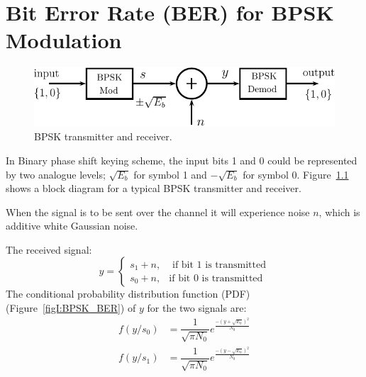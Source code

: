 
\chapter{Bit Error Rate (BER) for BPSK Modulation} \label{appendA}

\begin{figure}[!h]
\centering
\includegraphics[width=\textwidth]{./append1/BPSK_txrx}
\caption{BPSK transmitter and receiver.}
\label{figI:BPSK_txrx}
\end{figure}
\noindent In Binary phase shift keying scheme, the input bits 1 and 0 could be represented by two analogue levels; $ \sqrt{E_b} $ for symbol 1 and $ -\sqrt{E_b} $ for symbol 0. Figure~\ref{figI:BPSK_txrx} shows a block diagram for a typical BPSK transmitter and receiver. 

\par When the signal is to be sent over the channel it will experience noise $ n $, which is additive white Gaussian noise.




The received signal:
 \[
	{y}=
	\begin{cases}
	s_1+n, &\text{ if bit 1 is transmitted} \\
	s_0+n, & \text{if bit 0 is transmitted} 
	\end{cases} 
	\]
	The conditional probability distribution function (PDF) (Figure~\ref{figI:BPSK_BER}) of $ y $ for the two signals are:
	\begin{align}
	f(y/s_0)&=\dfrac{1}{\sqrt{\pi N_0}}e^{\frac{{-(y+\sqrt{E_b})}^2}{N_0}}\\
	f(y/s_1)&=\dfrac{1}{\sqrt{\pi N_0}}e^{\frac{{-(y-\sqrt{E_b})}^2}{N_0}}
	\end{align}
	
